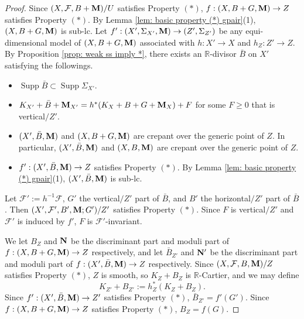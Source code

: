 \documentclass[11pt]{amsart}
\numberwithin{equation}{section}
\newcommand{\Mm}{{\bf{M}}}
\newcommand{\Nn}{{\bf{N}}}
\newcommand{\Rr}{\mathbb{R}}
\newcommand{\Supp}{\operatorname{Supp}}
\newcommand{\Ff}{\mathcal{F}}
\theoremstyle{definition}
\theoremstyle{definition}
\theoremstyle{definition}
\begin{document}
\begin{proof}
Since $(X,\Ff,B+\Mm)/U$ satisfies Property $(*)$, $f: (X,B+G,\Mm)\rightarrow Z$ satisfies Property $(*)$. By Lemma \ref{lem: basic property (*) gpair}(1), $(X,B+G,\Mm)$ is sub-lc. Let $f': (X',\Sigma_{X'},\Mm)\rightarrow (Z',\Sigma_{Z'})$ be any equi-dimensional model of $(X,B+G,\Mm)$ associated with $h: X'\rightarrow X$ and $h_Z: Z'\rightarrow Z$. By Proposition \ref{prop: weak ss imply *}, there exists an $\Rr$-divisor $\bar B$ on $X'$ satisfying the followings.
\begin{itemize}
    \item $\Supp \bar B\subset\Supp\Sigma_{X'}$.
    \item $K_{X'}+\bar B+\Mm_{X'}=h^*(K_X+B+G+\Mm_X)+F$ for some $F\geq 0$ that is vertical$/Z'$.
\item $(X',\bar B,\Mm)$ and $(X,B+G,\Mm)$ are crepant over the generic point of $Z$. In particular, $(X',\bar B,\Mm)$ and $(X,B,\Mm)$ are crepant over the generic point of $Z$.
\item $f': (X',\bar B,\Mm)\rightarrow Z$ satisfies Property $(*)$. By Lemma \ref{lem: basic property (*) gpair}(1), $(X',\bar B,\Mm)$ is sub-lc.
\end{itemize}
Let $\Ff':=h^{-1}\Ff$, $G'$ the vertical$/Z'$ part of $\bar B$, and $B'$ the horizontal$/Z'$ part of $\bar B$. Then $(X',\Ff',B',\Mm;G')/Z'$ satisfies Property $(*)$. Since $F$ is vertical$/Z'$ and $\Ff'$ is induced by $f'$, $F$ is $\Ff'$-invariant.

We let $B_Z$ and $\Nn$ be the discriminant part and moduli part of $f: (X,B+G,\Mm)\rightarrow Z$ respectively, and let $\bar B_{Z'}$ and $\Nn'$ be the discriminant part and moduli part of $f: (X',\bar B,\Mm)\rightarrow Z$ respectively. Since $(X,\Ff,B,\Mm)/Z$ satisfies Property $(*)$, $Z$ is smooth, so $K_Z+B_Z$ is $\Rr$-Cartier, and we may define
$$K_{Z'}+B_{Z'}:=h_Z^*(K_Z+B_Z).$$
Since $f': (X',\bar B,\Mm)\rightarrow Z'$ satisfies Property $(*)$, $\bar B_{Z'}=f'(G')$. Since $f: (X,B+G,\Mm)\rightarrow Z$ satisfies Property $(*)$, $B_Z=f(G)$.


\end{proof}
\end{document}
